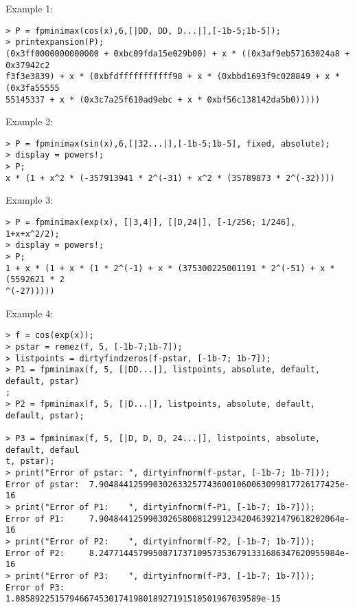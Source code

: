 \noindent Example 1: 
\begin{center}\begin{minipage}{15cm}\begin{Verbatim}[frame=single]
> P = fpminimax(cos(x),6,[|DD, DD, D...|],[-1b-5;1b-5]);
> printexpansion(P);
(0x3ff0000000000000 + 0xbc09fda15e029b00) + x * ((0x3af9eb57163024a8 + 0x37942c2
f3f3e3839) + x * (0xbfdfffffffffff98 + x * (0xbbd1693f9c028849 + x * (0x3fa55555
55145337 + x * (0x3c7a25f610ad9ebc + x * 0xbf56c138142da5b0)))))
\end{Verbatim}
\end{minipage}\end{center}
\noindent Example 2: 
\begin{center}\begin{minipage}{15cm}\begin{Verbatim}[frame=single]
> P = fpminimax(sin(x),6,[|32...|],[-1b-5;1b-5], fixed, absolute);
> display = powers!;
> P;
x * (1 + x^2 * (-357913941 * 2^(-31) + x^2 * (35789873 * 2^(-32))))
\end{Verbatim}
\end{minipage}\end{center}
\noindent Example 3: 
\begin{center}\begin{minipage}{15cm}\begin{Verbatim}[frame=single]
> P = fpminimax(exp(x), [|3,4|], [|D,24|], [-1/256; 1/246], 1+x+x^2/2);
> display = powers!;
> P;
1 + x * (1 + x * (1 * 2^(-1) + x * (375300225001191 * 2^(-51) + x * (5592621 * 2
^(-27)))))
\end{Verbatim}
\end{minipage}\end{center}
\noindent Example 4: 
\begin{center}\begin{minipage}{15cm}\begin{Verbatim}[frame=single]
> f = cos(exp(x));
> pstar = remez(f, 5, [-1b-7;1b-7]);
> listpoints = dirtyfindzeros(f-pstar, [-1b-7; 1b-7]);
> P1 = fpminimax(f, 5, [|DD...|], listpoints, absolute, default, default, pstar)
;
> P2 = fpminimax(f, 5, [|D...|], listpoints, absolute, default, default, pstar);

> P3 = fpminimax(f, 5, [|D, D, D, 24...|], listpoints, absolute, default, defaul
t, pstar);
> print("Error of pstar: ", dirtyinfnorm(f-pstar, [-1b-7; 1b-7]));
Error of pstar:  7.9048441259903026332577436001060063099817726177425e-16
> print("Error of P1:    ", dirtyinfnorm(f-P1, [-1b-7; 1b-7]));
Error of P1:     7.9048441259903026580081299123420463921479618202064e-16
> print("Error of P2:    ", dirtyinfnorm(f-P2, [-1b-7; 1b-7]));
Error of P2:     8.2477144579950871737109573536791331686347620955984e-16
> print("Error of P3:    ", dirtyinfnorm(f-P3, [-1b-7; 1b-7]));
Error of P3:     1.08589225157946674530174198018927191510501967039589e-15
\end{Verbatim}
\end{minipage}\end{center}
